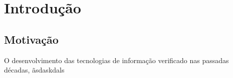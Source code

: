 
\cleardoublepage
{}
\chapter{Introdução}

\section{Motivação}
O desenvolvimento das tecnologias de informação verificado nas passadas décadas,
ãsdaskdals 
